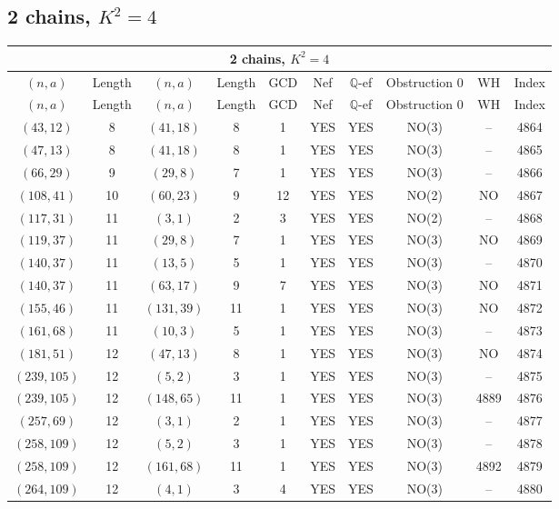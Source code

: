 \subsection{2 chains, $K^2 = 4$}
\begin{longtable}{|c|c|c|c|c|c|c|c|c|c|}
\hline
\multicolumn{10}{|c|}{2 chains, $K^2 = 4$}\\
\hline
$(n,a)$ & Length & $(n,a)$ & Length & GCD & Nef & $\mathbb Q$-ef & Obstruction 0 & WH & Index\\
\hline
\endfirsthead

\hline
$(n,a)$ & Length & $(n,a)$ & Length & GCD & Nef & $\mathbb Q$-ef & Obstruction 0 & WH & Index\\
\hline
\endhead
\hline
\endfoot

$(43, 12)$ & 8 & $(41, 18)$ & 8 & 1 & YES & YES & NO(3) & -- & 4864\\
$(47, 13)$ & 8 & $(41, 18)$ & 8 & 1 & YES & YES & NO(3) & -- & 4865\\
$(66, 29)$ & 9 & $(29, 8)$ & 7 & 1 & YES & YES & NO(3) & -- & 4866\\
$(108, 41)$ & 10 & $(60, 23)$ & 9 & 12 & YES & YES & NO(2) & NO & 4867\\
$(117, 31)$ & 11 & $(3, 1)$ & 2 & 3 & YES & YES & NO(2) & -- & 4868\\
$(119, 37)$ & 11 & $(29, 8)$ & 7 & 1 & YES & YES & NO(3) & NO & 4869\\
$(140, 37)$ & 11 & $(13, 5)$ & 5 & 1 & YES & YES & NO(3) & -- & 4870\\
$(140, 37)$ & 11 & $(63, 17)$ & 9 & 7 & YES & YES & NO(3) & NO & 4871\\
$(155, 46)$ & 11 & $(131, 39)$ & 11 & 1 & YES & YES & NO(3) & NO & 4872\\
$(161, 68)$ & 11 & $(10, 3)$ & 5 & 1 & YES & YES & NO(3) & -- & 4873\\
$(181, 51)$ & 12 & $(47, 13)$ & 8 & 1 & YES & YES & NO(3) & NO & 4874\\
$(239, 105)$ & 12 & $(5, 2)$ & 3 & 1 & YES & YES & NO(3) & -- & 4875\\
$(239, 105)$ & 12 & $(148, 65)$ & 11 & 1 & YES & YES & NO(3) & 4889 & 4876\\
$(257, 69)$ & 12 & $(3, 1)$ & 2 & 1 & YES & YES & NO(3) & -- & 4877\\
$(258, 109)$ & 12 & $(5, 2)$ & 3 & 1 & YES & YES & NO(3) & -- & 4878\\
$(258, 109)$ & 12 & $(161, 68)$ & 11 & 1 & YES & YES & NO(3) & 4892 & 4879\\
$(264, 109)$ & 12 & $(4, 1)$ & 3 & 4 & YES & YES & NO(3) & -- & 4880\\

\end{longtable}
